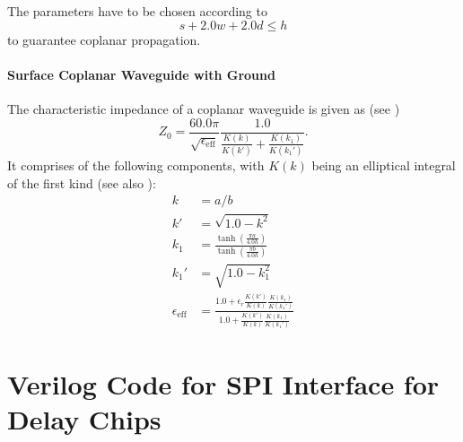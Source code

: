 The parameters have to be chosen according to 
\begin{equation}
	s + 2.0 w + 2.0 d \leq h
\end{equation}
to guarantee coplanar propagation. \cite{wadell}


\paragraph{Surface Coplanar Waveguide with Ground}  
The characteristic impedance of a coplanar waveguide is given as (see \cite{wadell}) 
\begin{equation}
	Z_0 = \frac{60.0 \pi}{\sqrt{\epsilon_\text{eff}}} \frac{1.0}{\frac{K(k)}{K(k')} + \frac{K(k_1)}{K(k_1')}}.
\end{equation}
It comprises of the following components, with $K(k)$ being an elliptical integral of the first kind (see also \cite[p.~430]{bronstein}):
\begin{align}
	k &= a/b\\
	k' &= \sqrt{1.0 - k^{2}}\\
	k_1 &= \frac{\tanh(\frac{\pi a}{4.0  h})}{\tanh(\frac{\pi  b}{4.0 h})}\\
	k_1' &= \sqrt{1.0 - k_1^{2}}\\
	\epsilon_\text{eff} &= \frac{1.0 + \epsilon_r \frac{K(k')}{K(k)} \frac{K(k_1)}{K(k_1')}}{1.0 + \frac{K(k')}{K(k)} \frac{K(k_1)}{K(k_1')}}
\end{align}

\section{Verilog Code for SPI Interface for Delay Chips} \label{app:code}

